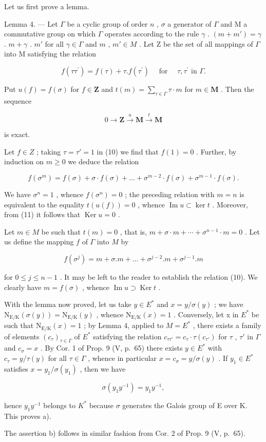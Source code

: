 Let us first prove a lemma.

Lemma 4. --- Let \(\Gamma\) be a cyclic group of order \(n\) , \(\sigma\) a generator of \(\Gamma\) and M a commutative group on which \(\Gamma\) operates according to the rule \(\gamma\) . \((m + m') = \gamma\) . \(m + \gamma\) . \(m'\) for all \(\gamma \in \Gamma\) and \(m\) , \(m' \in M\) . Let Z be the set of all mappings of \(\Gamma\) into M satisfying the relation

\[
f \left(\tau \tau^ {\prime}\right) = f (\tau) + \tau . f \left(\tau^ {\prime}\right) \quad \text { for } \quad \tau , \tau^ {\prime} \text { in } \Gamma .\tag{10}
\]

Put \(u(f) = f(\sigma)\) for \(f \in \mathbf{Z}\) and \(t(m) = \sum_{\tau \in \Gamma} \tau \cdot m\) for \(m \in \mathbf{M}\) . Then the sequence

\[
0 \to \mathbf {Z} \xrightarrow {u} \mathbf {M} \xrightarrow {t} \mathbf {M}
\]

is exact.

Let \(f \in Z\) ; taking \(\tau = \tau' = 1\) in (10) we find that \(f(1) = 0\) . Further, by induction on \(m \geqslant 0\) we deduce the relation

\[
f (\sigma^ {m}) = f (\sigma) + \sigma \cdot f (\sigma) + \dots + \sigma^ {m - 2} \cdot f (\sigma) + \sigma^ {m - 1} \cdot f (\sigma).\tag{11}
\]

We have \(\sigma^n = 1\) , whence \(f(\sigma^n) = 0\) ; the preceding relation with \(m = n\) is equivalent to the equality \(t(u(f)) = 0\) , whence \(\operatorname{Im} u \subset \ker t\) . Moreover, from (11) it follows that \(\operatorname{Ker} u = 0\) .

Let \(m \in M\) be such that \(t(m) = 0\) , that is, \(m + \sigma \cdot m + \cdots + \sigma^{n-1} \cdot m = 0\) . Let us define the mapping \(f\) of \(\Gamma\) into \(M\) by

\[
f \left(\sigma^ {j}\right) = m + \sigma . m + \dots + \sigma^ {j - 2}. m + \sigma^ {j - 1}. m\tag{12}
\]

for \(0 \leqslant j \leqslant n - 1\) . It may be left to the reader to establish the relation (10). We clearly have \(m = f(\sigma)\) , whence \(\operatorname{Im} u \supset \operatorname{Ker} t\) .

With the lemma now proved, let us take \(y \in E^{*}\) and \(x = y / \sigma(y)\) ; we have \(\mathrm{N}_{\mathrm{E}/\mathrm{K}}(\sigma(y)) = \mathrm{N}_{\mathrm{E}/\mathrm{K}}(y)\) , whence \(\mathrm{N}_{\mathrm{E}/\mathrm{K}}(x) = 1\) . Conversely, let x in \(E^{*}\) be such that \(\mathrm{N}_{\mathrm{E}/\mathrm{K}}(x) = 1\) ; by Lemma 4, applied to \(M = E^{*}\) , there exists a family of elements \((c_{\tau})_{\tau \in \Gamma}\) of \(E^{*}\) satisfying the relation \(c_{\tau\tau'} = c_{\tau} \cdot \tau(c_{\tau'})\) for \(\tau\) , \(\tau'\) in \(\Gamma\) and \(c_{\sigma} = x\) . By Cor. 1 of Prop. 9 (V, p.~65) there exists \(y \in E^{*}\) with \(c_{\tau} = y / \tau(y)\) for all \(\tau \in \Gamma\) , whence in particular \(x = c_{\sigma} = y / \sigma(y)\) . If \(y_{1} \in E^{*}\) satisfies \(x = y_{1} / \sigma(y_{1})\) , then we have

\[
\sigma \left(y _ {1} y ^ {- 1}\right) = y _ {1} y ^ {- 1},
\]

hence \(y_{1}y^{-1}\) belongs to \(K^{*}\) because \(\sigma\) generates the Galois group of E over K. This proves a).

The assertion b) follows in similar fashion from Cor. 2 of Prop. 9 (V, p.~65).

